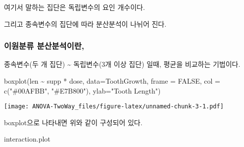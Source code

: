 \documentclass[
]{article}
\newenvironment{Shaded}{\begin{snugshade}}{\end{snugshade}}
\newcommand{\AttributeTok}[1]{\textcolor[rgb]{0.77,0.63,0.00}{#1}}
\newcommand{\ConstantTok}[1]{\textcolor[rgb]{0.00,0.00,0.00}{#1}}
\newcommand{\FunctionTok}[1]{\textcolor[rgb]{0.00,0.00,0.00}{#1}}
\newcommand{\NormalTok}[1]{#1}
\newcommand{\SpecialCharTok}[1]{\textcolor[rgb]{0.00,0.00,0.00}{#1}}
\newcommand{\StringTok}[1]{\textcolor[rgb]{0.31,0.60,0.02}{#1}}
\begin{document}
여기서 말하는 집단은 독립변수의 요인 개수이다.

그리고 종속변수의 집단에 따라 분산분석이 나뉘어 진다.

\hypertarget{uxc774uxc6d0uxbd84uxb958-uxbd84uxc0b0uxbd84uxc11duxc774uxb780-1}{%
\subsubsection{이원분류 분산분석이란,}\label{uxc774uxc6d0uxbd84uxb958-uxbd84uxc0b0uxbd84uxc11duxc774uxb780-1}}

종속변수(두 개 집단) \textasciitilde{} 독립변수(3개 이상 집단) 일때, 평균을 비교하는 기법이다.

\begin{Shaded}
\begin{Highlighting}[]
\FunctionTok{boxplot}\NormalTok{(len }\SpecialCharTok{\textasciitilde{}}\NormalTok{ supp }\SpecialCharTok{*}\NormalTok{ dose, }
        \AttributeTok{data=}\NormalTok{ToothGrowth,}
        \AttributeTok{frame =} \ConstantTok{FALSE}\NormalTok{, }
        \AttributeTok{col =} \FunctionTok{c}\NormalTok{(}\StringTok{"\#00AFBB"}\NormalTok{, }\StringTok{"\#E7B800"}\NormalTok{),}
        \AttributeTok{ylab=}\StringTok{"Tooth Length"}\NormalTok{)}
\end{Highlighting}
\end{Shaded}

\texttt{[image: ANOVA-TwoWay\_files/figure-latex/unnamed-chunk-3-1.pdf]}

boxplot으로 나타내면 위와 같이 구성되어 있다.

\begin{Shaded}
\begin{Highlighting}[]
\NormalTok{interaction.plot}
\end{Highlighting}
\end{Shaded}
\end{document}

